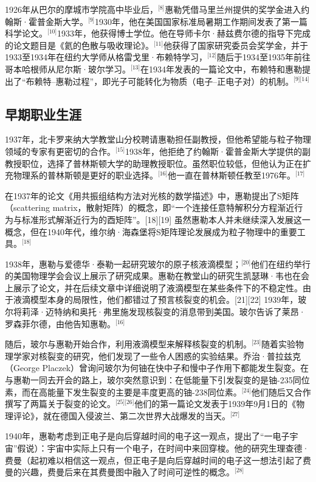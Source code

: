 1926年从巴尔的摩城市学院高中毕业后，\(^\text{[8]}\)惠勒凭借马里兰州提供的奖学金进入约翰斯·霍普金斯大学。\(^\text{[9]}\)1930年，他在美国国家标准局暑期工作期间发表了第一篇科学论文。\(^\text{[10]}\)1933年，他获得博士学位。他在导师卡尔·赫兹费尔德的指导下完成的论文题目是《氦的色散与吸收理论》。\(^\text{[11]}\)他获得了国家研究委员会奖学金，并于1933至1934年在纽约大学师从格雷戈里·布赖特学习，\(^\text{[12]}\)随后于1934至1935年前往哥本哈根师从尼尔斯·玻尔学习。\(^\text{[13]}\)在1934年发表的一篇论文中，布赖特和惠勒提出了“布赖特–惠勒过程”，即光子可能转化为物质（电子–正电子对）的机制。\(^\text{[9][14]}\)
\subsection{早期职业生涯}
1937年，北卡罗来纳大学教堂山分校聘请惠勒担任副教授，但他希望能与粒子物理领域的专家有更密切的合作。\(^\text{[15]}\)1938年，他拒绝了约翰斯·霍普金斯大学提供的副教授职位，选择了普林斯顿大学的助理教授职位。虽然职位较低，但他认为正在扩充物理系的普林斯顿是更好的职业选择。\(^\text{[16]}\)他一直在普林斯顿任教至1976年。\(^\text{[17]}\)

在1937年的论文《用共振组结构方法对光核的数学描述》中，惠勒提出了S矩阵（scattering matrix，散射矩阵）的概念，即“一个连接任意特解积分方程渐近行为与标准形式解渐近行为的酉矩阵”。[18][19] 虽然惠勒本人并未继续深入发展这一概念，但在1940年代，维尔纳·海森堡将S矩阵理论发展成为粒子物理中的重要工具。\(^\text{[18]}\)

1938年，惠勒与爱德华·泰勒一起研究玻尔的原子核液滴模型；\(^\text{[20]}\)他们在纽约举行的美国物理学会会议上展示了研究成果。惠勒在教堂山的研究生凯瑟琳·韦也在会上展示了论文，并在后续文章中详细说明了液滴模型在某些条件下的不稳定性。由于液滴模型本身的局限性，他们都错过了预言核裂变的机会。[21][22] 1939年，玻尔将莉泽·迈特纳和奥托·弗里施发现核裂变的消息带到美国。玻尔告诉了莱昂·罗森菲尔德，由他告知惠勒。\(^\text{[16]}\)

随后，玻尔与惠勒开始合作，利用液滴模型来解释核裂变的机制。\(^\text{[23]}\)随着实验物理学家对核裂变的研究，他们发现了一些令人困惑的实验结果。乔治·普拉兹克（George Placzek）曾询问玻尔为何铀在快中子和慢中子作用下都能发生裂变。在与惠勒一同去开会的路上，玻尔突然意识到：在低能量下引发裂变的是铀-235同位素，而在高能量下发生裂变的主要是丰度更高的铀-238同位素。\(^\text{[24]}\)他们随后又合作撰写了两篇关于裂变的论文。\(^\text{[25][26]}\)他们的第一篇论文发表于1939年9月1日的《物理评论》，就在德国入侵波兰、第二次世界大战爆发的当天。\(^\text{[27]}\)

1940年，惠勒考虑到正电子是向后穿越时间的电子这一观点，提出了“一电子宇宙”假说）：宇宙中实际上只有一个电子，在时间中来回穿梭。他的研究生理查德·费曼（起初难以相信这一观点，但正电子是向后穿越时间的电子这一想法引起了费曼的兴趣，费曼后来在其费曼图中融入了时间可逆性的概念。\(^\text{[28]}\)
